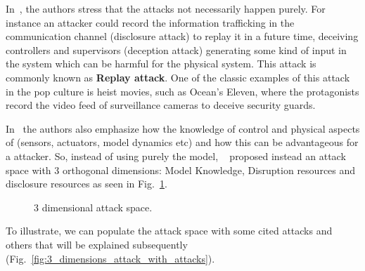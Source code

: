 \documentclass[../main.tex]{subfiles}
\begin{document}
In~\cite{TeixeiraEtAl2015}, the authors stress that the attacks not necessarily happen purely.
For instance an attacker could record the information trafficking in the communication channel (disclosure attack) to replay it in a future time, deceiving controllers and supervisors (deception attack) generating some kind of input in the system which can be harmful for the physical system.
This attack is commonly known as \textbf{Replay attack}.
One of the classic examples of this attack in the pop culture is heist movies, such as Ocean's Eleven, where the protagonists record the video feed of surveillance cameras to deceive security guards.

In~\cite{TeixeiraEtAl2015} the authors also emphasize how the knowledge of control and physical aspects of \cps{} (sensors, actuators, model dynamics etc) and how this can be advantageous for a attacker.
So, instead of using purely the \DDD{} model, \citeauthor{TeixeiraEtAl2015}~\cite{TeixeiraEtAl2015} proposed instead an attack space with 3 orthogonal dimensions: Model Knowledge, Disruption resources and disclosure resources as seen in Fig.~\ref{fig:3_dimensions_attack}.

\usetikzlibrary{3d}
\usetikzlibrary{perspective}
\begin{figure}[h]
  \centering
  \caption{3 dimensional attack space.}\label{fig:3_dimensions_attack}
\end{figure}

To illustrate, we can populate the attack space with some cited attacks and others that will be explained subsequently (Fig.~\ref{fig:3_dimensions_attack_with_attacks}).
\end{document}
